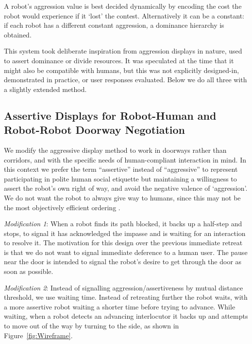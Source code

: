 \documentclass[letterpaper, 10 pt, conference]{ieeeconf}  %
\begin{document}
A robot's aggression value is best decided dynamically by encoding the cost the robot would experience if it `lost' the contest. Alternatively it can be a constant: if each robot has a different constant aggression, a dominance hierarchy is obtained.
 
This system took deliberate inspiration from aggression displays in nature, used to assert dominance or divide resources. It was speculated at the time that it might also be compatible with humans, but this was not explicitly designed-in, demonstrated in practice, or user responses evaluated. Below we do all three with a slightly extended method. 


\subsection{Assertive Displays for Robot-Human and Robot-Robot Doorway Negotiation}
We modify the aggressive display method to work in doorways rather than corridors, and with the specific needs of human-compliant interaction in mind. In this context we prefer the term ``assertive'' instead of ``aggressive'' to  represent participating in polite human social etiquette but maintaining a willingness to assert the robot’s own right of way, and avoid the negative valence of `aggression'. We do not want the robot to always give way to humans, since this may not be the most objectively efficient ordering \cite{zuluaga2005reducing}.


\textit{Modification 1}:  When a robot finds its path blocked, it backs up a half-step and stops, to signal it has acknowledged the impasse and is waiting for an interaction to resolve it. The motivation for this design over the previous immediate retreat is that we do not want to signal immediate deference to a human user. The pause near the door is intended to signal the robot's desire to get through the door as soon as possible.

\textit{Modification 2}: Instead of signalling aggression/assertiveness by mutual distance threshold, we use waiting time. Instead of retreating further the robot waits, with a more assertive robot waiting a shorter time before trying to advance. While waiting, when a robot detects an advancing interlocutor it backs up and attempts to move out of the way by turning to the side, as shown in Figure~\ref{fig:Wireframe}.
\end{document}
